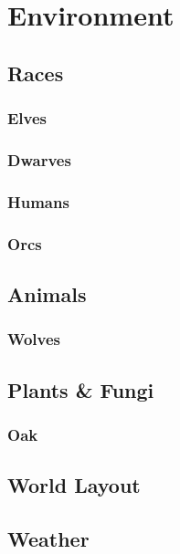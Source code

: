 \documentclass[a4paper]{report}
\begin{document}
	\chapter{Environment}

		\section{Races}

			\subsection{Elves}

			\subsection{Dwarves}

			\subsection{Humans}

			\subsection{Orcs}

		\section{Animals}

			\subsection{Wolves}

		\section{Plants \& Fungi}

			\subsection{Oak} 

		\section{World Layout}

		\section{Weather}
\end{document}
